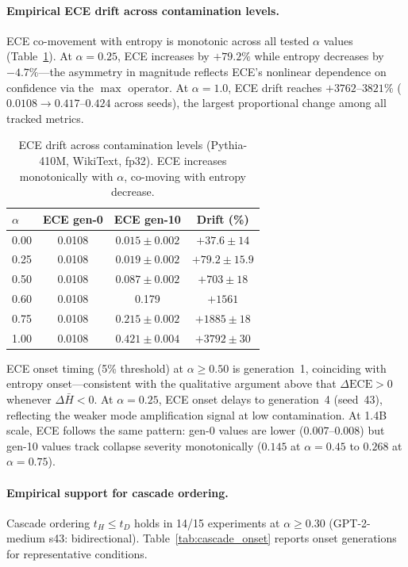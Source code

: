 \paragraph{Empirical ECE drift across contamination levels.}
ECE co-movement with entropy is monotonic across all tested $\alpha$ values (Table~\ref{tab:ece_drift}).
At $\alpha{=}0.25$, ECE increases by $+79.2\%$ while entropy decreases by $-4.7\%$---the asymmetry in magnitude reflects ECE's nonlinear dependence on confidence via the $\max$ operator.
At $\alpha{=}1.0$, ECE drift reaches $+3762$--$3821\%$ ($0.0108 \to 0.417$--$0.424$ across seeds), the largest proportional change among all tracked metrics.

\begin{table}[t]
\centering
\small
\caption{ECE drift across contamination levels (Pythia-410M, WikiText, fp32). ECE increases monotonically with $\alpha$, co-moving with entropy decrease.}
\label{tab:ece_drift}
\begin{tabular}{lccc}
\toprule
$\alpha$ & ECE gen-0 & ECE gen-10 & Drift (\%) \\
\midrule
0.00 & 0.0108 & $0.015{\pm}0.002$ & $+37.6{\pm}14$ \\
0.25 & 0.0108 & $0.019{\pm}0.002$ & $+79.2{\pm}15.9$ \\
0.50 & 0.0108 & $0.087{\pm}0.002$ & $+703{\pm}18$ \\
0.60 & 0.0108 & 0.179 & $+1561$ \\
0.75 & 0.0108 & $0.215{\pm}0.002$ & $+1885{\pm}18$ \\
1.00 & 0.0108 & $0.421{\pm}0.004$ & $+3792{\pm}30$ \\
\bottomrule
\end{tabular}
\end{table}

ECE onset timing (5\% threshold) at $\alpha{\geq}0.50$ is generation~1, coinciding with entropy onset---consistent with the qualitative argument above that $\Delta\mathrm{ECE} > 0$ whenever $\Delta\bar{H} < 0$.
At $\alpha{=}0.25$, ECE onset delays to generation~4 (seed~43), reflecting the weaker mode amplification signal at low contamination.
At 1.4B scale, ECE follows the same pattern: gen-0 values are lower ($0.007$--$0.008$) but gen-10 values track collapse severity monotonically ($0.145$ at $\alpha{=}0.45$ to $0.268$ at $\alpha{=}0.75$).

\paragraph{Empirical support for cascade ordering.}
Cascade ordering $t_H \leq t_D$ holds in 14/15 experiments at $\alpha \geq 0.30$ (GPT-2-medium s43: bidirectional).
Table~\ref{tab:cascade_onset} reports onset generations for representative conditions.

